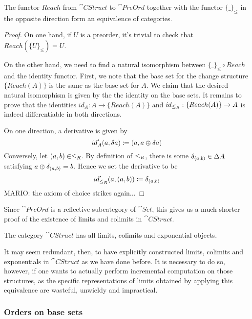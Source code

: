 \begin{thm}
  The functor $Reach$ from $\cat{CStruct}$ to $\cat{PreOrd}$ together with the 
  functor $\{\_\}_\leq$ in the opposite direction form an equivalence of categories.
\end{thm}
\begin{proof}
  On one hand, if $U$ is a preorder, it's trivial to check that $Reach (\{U\}_\leq) = U$.

  On the other hand, we need to find a natural isomorphism between $\{\_\}_\leq \circ Reach$
  and the identity functor. First, we note that the base set for the change structure $\{Reach(A)\}$ is
  the same as the base set for $A$. We claim that the desired natural isomorphism is given by the
  the identity on the base sets. It remains to prove that the identities
  $id_A : A \rightarrow \{Reach(A)\}$ and $id_{\leq_R} : \{Reach(A)\} \rightarrow A$
  is indeed differentiable in both directions.

  On one direction, a derivative is given by
  $$
    id'_A(a, \delta a) \coloneqq (a, a \oplus \delta a)
  $$
  Conversely, let $(a, b) \in \leq_R$. By definition of $\leq_R$, there is some
  $\delta_{(a, b)} \in \Delta A$ satisfying $a \oplus \delta_{(a,b)} = b$. Hence we set the
  derivative to be
  $$
    id'_{\leq_R}(a, (a, b)) \coloneqq \delta_{(a, b)}
  $$
  MARIO: the axiom of choice strikes again...
\end{proof}

Since $\cat{PreOrd}$ is a reflective subcategory of $\cat{Set}$, this gives us a much shorter proof
of the existence of limits and colimits in $\cat{CStruct}$.
\begin{corollary}
  The category $\cat{CStruct}$ has all limits, colimits and exponential objects. 
\end{corollary}

It may seem redundant, then, to have explicitly constructed limits, colimits and exponentials
in $\cat{CStruct}$ as we have done before. It is necessary to do so, however, if one wants to
actually perform incremental computation on those structures, as the specific representations
of limits obtained by applying this equivalence are wasteful, unwieldy and impractical.

\subsubsection{Orders on base sets}

